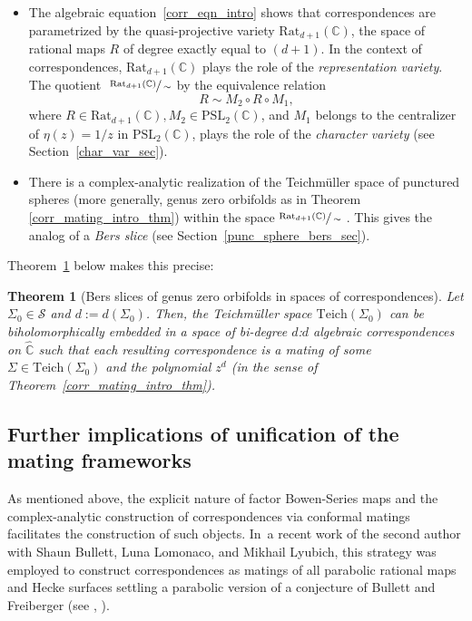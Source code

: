 \documentclass[JEP,XML,SOM,Unicode,NoFloatCountersInSection,published]{cedram}
\newtheorem{thmx}{Theorem}
\theoremstyle{definition}
\theoremstyle{remark}
\newcommand{\C}{\mathbb{C}}
\newcommand{\pslc}{{\mathrm{PSL}_2 (\mathbb{C})}}
\newcommand{\cS}{\mathcal{S}}
\begin{document}
\begin{itemize}
\item The algebraic equation~\eqref{corr_eqn_intro} shows that correspondences
are parametrized by the quasi-projective variety $\mathrm{Rat}_{d+1} (\C)$, the space of rational maps $R$ of degree exactly equal to
$(d+1)$.
In the context of correspondences, $\mathrm{Rat}_{d+1} (\C)$ plays the role of the \emph{representation variety}. The quotient $\ \sfrac{\mathrm{Rat}_{d+1}(\C)}{\sim}$ by the equivalence relation
\[
R\sim M_2\circ R\circ M_1,
\]
where $R\in \mathrm{Rat}_{d+1}(\C), M_2\in\pslc$, and $M_1$ belongs to the centralizer of $\eta(z)=1/z$ in $\pslc$, plays the role of the \emph{character variety} (see Section~\ref{char_var_sec}).

\item There is a complex-analytic realization of the Teichmüller space of punctured spheres (more generally, genus zero orbifolds as in Theorem \ref{corr_mating_intro_thm}) within the space $\sfrac{\mathrm{Rat}_{d+1}(\C)}{\sim}\ $. This gives the analog of a \emph{Bers slice} (see Section~\ref{punc_sphere_bers_sec}).
\end{itemize}

Theorem~\ref{punc_sphere_teich_corr_intro_thm} below makes this precise:

\begin{thmx}[Bers slices of genus zero orbifolds in spaces of correspondences]\label{punc_sphere_teich_corr_intro_thm}
Let $\Sigma_0\in\cS$ and $d:=d(\Sigma_0)$. Then, the Teichmüller space $\mathrm{Teich}(\Sigma_0)$ can be biholomorphically embedded in a space of bi-degree $d$:$d$ algebraic correspondences on $\widehat{\C}$ such that each resulting correspondence is a mating of some $\Sigma\in\mathrm{Teich}(\Sigma_0)$ and the polynomial $z^d$ (in the sense of Theorem~\ref{corr_mating_intro_thm}).
\end{thmx}

\subsection*{Further implications of unification of the mating frameworks}
As mentioned above, the explicit nature of factor Bowen-Series maps and the complex-analytic construction of correspondences via conformal matings facilitates the construction of such objects. In~a recent work of the second author with Shaun Bullett, Luna Lomonaco, and Mikhail Lyubich, this strategy was employed to construct correspondences as matings of all parabolic rational maps and Hecke surfaces settling a parabolic version of a conjecture of Bullett and Freiberger (see \cite{BLLM}, \cite[\S 3, p.\,3926]{BF03}).
\end{document}
